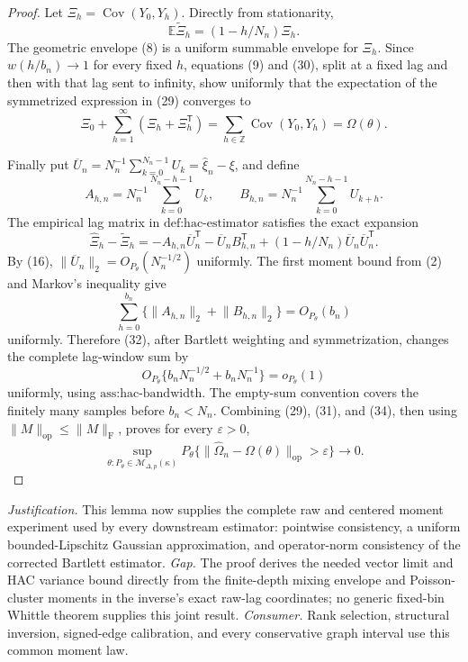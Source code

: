 \documentclass{article}
\begin{document}
\begin{proof}
Let \(\Xi_h=\operatorname{Cov}(Y_0,Y_h)\).  Directly from stationarity,
\[
 \mathbb E\widetilde\Xi_h=(1-h/N_n)\Xi_h.
\tag{30}
\]
The geometric envelope (8) is a uniform summable envelope for \(\Xi_h\).  Since \(w(h/b_n)\to1\) for every fixed \(h\), equations (9) and (30), split at a fixed lag and then with that lag sent to infinity, show uniformly that the expectation of the symmetrized expression in (29) converges to
\[
 \Xi_0+\sum_{h=1}^\infty(\Xi_h+\Xi_h^{\mathsf T})
 =\sum_{h\in\mathbb Z}\operatorname{Cov}(Y_0,Y_h)=\Omega(\theta).
\tag{31}
\]

Finally put \(\overline U_n=N_n^{-1}\sum_{k=0}^{N_n-1}U_k=\widehat\xi_n-\xi\), and define
\[
 A_{h,n}=N_n^{-1}\sum_{k=0}^{N_n-h-1}U_k,
 \qquad
 B_{h,n}=N_n^{-1}\sum_{k=0}^{N_n-h-1}U_{k+h}.
\]
The empirical lag matrix in \(\text{def:hac-estimator}\) satisfies the exact expansion
\[
 \widehat\Xi_h-\widetilde\Xi_h
 =-A_{h,n}\overline U_n^{\mathsf T}
  -\overline U_nB_{h,n}^{\mathsf T}
  +(1-h/N_n)\overline U_n\overline U_n^{\mathsf T}.
\tag{32}
\]
By (16), \(\lVert\overline U_n\rVert_2=O_{P_\theta}(N_n^{-1/2})\) uniformly.  The first moment bound from (2) and Markov's inequality give
\[
 \sum_{h=0}^{b_n}\{\lVert A_{h,n}\rVert_2+\lVert B_{h,n}\rVert_2\}=O_{P_\theta}(b_n)
\tag{33}
\]
uniformly.  Therefore (32), after Bartlett weighting and symmetrization, changes the complete lag-window sum by
\[
 O_{P_\theta}\{b_nN_n^{-1/2}+b_nN_n^{-1}\}=o_{P_\theta}(1)
\tag{34}
\]
uniformly, using \(\text{ass:hac-bandwidth}\).  The empty-sum convention covers the finitely many samples before \(b_n<N_n\).  Combining (29), (31), and (34), then using \(\lVert M\rVert_{\mathrm{op}}\leq\lVert M\rVert_{\mathrm F}\), proves for every \(\varepsilon>0\),
\[
 \sup_{\theta:P_\theta\in\mathcal M_{\Delta,p}(\kappa)}
 P_\theta\{\lVert\widehat\Omega_n-\Omega(\theta)\rVert_{\mathrm{op}}>\varepsilon\}
 \longrightarrow0.
\]
\end{proof}
\par\smallskip\noindent \textit{Justification.} This lemma now supplies the complete raw and centered moment experiment used by every downstream estimator: pointwise consistency, a uniform bounded-Lipschitz Gaussian approximation, and operator-norm consistency of the corrected Bartlett estimator. \textit{Gap.} The proof derives the needed vector limit and HAC variance bound directly from the finite-depth mixing envelope and Poisson-cluster moments in the inverse's exact raw-lag coordinates; no generic fixed-bin Whittle theorem supplies this joint result. \textit{Consumer.} Rank selection, structural inversion, signed-edge calibration, and every conservative graph interval use this common moment law.
\end{document}
